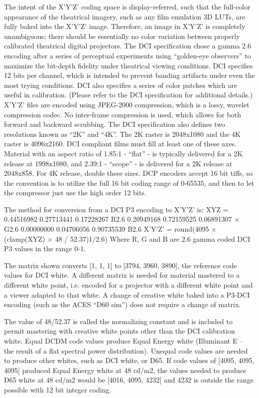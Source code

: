 The intent of the X’Y’Z’ coding space is display-referred, such that the full-color appearance of the theatrical imagery, such as any film emulation 3D LUTs, are fully baked into the X’Y’Z’ image. Therefore, an image in X’Y’Z’ is completely unambiguous; there should be essentially no color variation between properly calibrated theatrical digital projectors.
The DCI specification chose a gamma 2.6 encoding after a series of perceptual experiments using “golden-eye observers” to maximize the bit-depth fidelity under theatrical viewing conditions. DCI specifies 12 bits per channel, which is intended to prevent banding artifacts under even the most trying conditions. DCI also specifies a series of color patches which are useful in calibration. (Please refer to the DCI specification for additional details.) X’Y’Z’ files are encoded using JPEG-2000 compression, which is a lossy, wavelet compression codec. No inter-frame compression is used, which allows for both forward and backward scrubbing. The DCI specification also defines two resolutions known as “2K” and “4K”. The 2K raster is 2048x1080 and the 4K raster is 4096x2160. DCI compliant films must fill at least one of these axes. Material with an aspect ratio of 1.85:1 - “flat” - is typically delivered for a 2K release at 1998x1080, and 2.39:1 - “scope” - is delivered for a 2K release at 2048x858. For 4K release, double these sizes. DCP encoders accept 16 bit tiffs, so the convention is to utilize the full 16 bit coding range of 0-65535, and then to let the compressor just use the high order 12 bits.

The method for conversion from a DCI P3 encoding to X’Y’Z’ is:
	XYZ = 	  0.44516982   0.27713441   0.17228267 	  R2.6
		  0.20949168   0.72159525   0.06891307	      ×	  G2.6
		  0.00000000   0.04706056   0.90735539   	  B2.6
	X’Y’Z’ = round(4095 × (clamp(XYZ) × 48 / 52.37)1/2.6)
Where R, G and B are 2.6 gamma coded DCI P3 values in the range 0-1.

The matrix shown converts [1, 1, 1] to [3794, 3960, 3890], the reference code values for DCI white. A different matrix is needed for material mastered to a different white point, i.e. encoded for a projector with a different white point and a viewer adapted to that white. A change of creative white baked into a P3-DCI encoding (such as the ACES “D60 sim”) does not require a change of matrix.

The value of 48/52.37 is called the normalizing constant and is included to permit mastering with creative white points other than the DCI calibration white. Equal DCDM code values produce Equal Energy white (Illuminant E – the result of a flat spectral power distribution). Unequal code values are needed to produce other whites, such as DCI white, or D65. If code values of [4095, 4095, 4095] produced Equal Energy white at 48 cd/m2, the values needed to produce D65 white at 48 cd/m2 would be [4016, 4095, 4232] and 4232 is outside the range possible with 12 bit integer coding.

